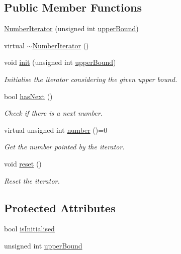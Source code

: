 \subsection*{\-Public \-Member \-Functions}
\begin{DoxyCompactItemize}
\item 
\hyperlink{classmultiscale_1_1NumberIterator_adc85caa104c89062cb7c3072b65da827}{\-Number\-Iterator} (unsigned int \hyperlink{classmultiscale_1_1NumberIterator_a56a5558958778bbde64e249d67cba886}{upper\-Bound})
\item 
virtual \hyperlink{classmultiscale_1_1NumberIterator_aae2ce809339ed853f49619ad69596229}{$\sim$\-Number\-Iterator} ()
\item 
void \hyperlink{classmultiscale_1_1NumberIterator_a7bec93b2150c52b022de484c49b551e0}{init} (unsigned int \hyperlink{classmultiscale_1_1NumberIterator_a56a5558958778bbde64e249d67cba886}{upper\-Bound})
\begin{DoxyCompactList}\small\item\em \-Initialise the iterator considering the given upper bound. \end{DoxyCompactList}\item 
bool \hyperlink{classmultiscale_1_1NumberIterator_a9169e7244347d2dbd657ad4f36b55f5b}{has\-Next} ()
\begin{DoxyCompactList}\small\item\em \-Check if there is a next number. \end{DoxyCompactList}\item 
virtual unsigned int \hyperlink{classmultiscale_1_1NumberIterator_a967fc14523f8726d5d6352d4ed6439ca}{number} ()=0
\begin{DoxyCompactList}\small\item\em \-Get the number pointed by the iterator. \end{DoxyCompactList}\item 
void \hyperlink{classmultiscale_1_1NumberIterator_a9e22075eb67dd5ebf4b03a4a67734a36}{reset} ()
\begin{DoxyCompactList}\small\item\em \-Reset the iterator. \end{DoxyCompactList}\end{DoxyCompactItemize}
\subsection*{\-Protected \-Attributes}
\begin{DoxyCompactItemize}
\item 
bool \hyperlink{classmultiscale_1_1NumberIterator_ae3d929444e14677de0b616a059380f3f}{is\-Initialised}
\item 
unsigned int \hyperlink{classmultiscale_1_1NumberIterator_a56a5558958778bbde64e249d67cba886}{upper\-Bound}
\end{DoxyCompactItemize}
